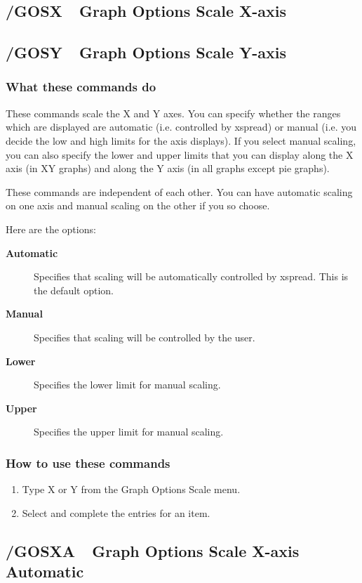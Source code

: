 \subsection*{/GOSX\ \    Graph Options Scale X-axis}
\subsection*{/GOSY\ \    Graph Options Scale Y-axis}

\subsubsection*{What these commands do}
These commands scale the X and Y axes.  You can specify whether the 
ranges which are displayed are automatic (i.e. controlled by xspread) 
or manual (i.e. you decide the low and high limits for the axis 
displays).  If you select manual scaling, you can also specify the 
lower and upper limits that you can display along the X axis (in XY 
graphs) and along the Y axis (in all graphs except pie graphs).

These commands are independent of each other.  You can have automatic 
scaling on one axis and manual scaling on the other if you so choose.

Here are the options:
\begin{description}
\item[{\bf Automatic}]{Specifies that scaling will be automatically
        controlled by xspread.  This is the default option.}
\item[{\bf Manual}]{Specifies that scaling will be controlled by the
        user.}
\item[{\bf Lower }]{Specifies the lower limit for manual scaling.}
\item[{\bf Upper }]{Specifies the upper limit for manual scaling.}
\end{description}

\subsubsection*{How to use these commands}
\begin{enumerate}
\item{Type X or Y from the Graph Options Scale menu.}
\item{Select and complete the entries for an item.}
\end{enumerate}

\subsection*{/GOSXA\ \   Graph Options Scale X-axis Automatic}
